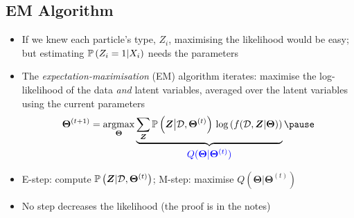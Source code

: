 \begin{slide}
\section[-1]{EM Algorithm}

\begin{PauseHighLight}
  \begin{itemize}
  \item If we knew each particle's type, $Z_i$, maximising the
    likelihood would be easy\pause{}; but estimating $\mathbb{P}\left( Z_i=1|X_i \right)$
    needs the parameters\pauseb
  \item The \emph{expectation-maximisation} (EM) algorithm iterates:
    maximise the log-likelihood of the data \emph{and} latent
    variables, averaged over the latent variables using the current
    parameters
    \begin{align*}
      \bm{\Theta}^{(t+1)} = \mathop{\mathrm{argmax}}_{\bm{\Theta}}
      \underbrace{\sum_{\bm{Z}} \Prob{\bm{Z}\big|\data,\bm{\Theta}^{(t)}}\,
      \logg{f(\data,\bm{Z}| \bm{\Theta})}}_{\textstyle\color{EmphColor}
        Q(\bm{\Theta}|\bm{\Theta}^{(t)})}\pause
    \end{align*}
  \item E-step: compute $\mathbb{P}\left( \bm{Z}|\mathcal{D},\bm{\Theta}^{(t)} \right)$;\pause{}
    M-step: maximise $Q(\bm{\Theta}|\bm{\Theta}^{(t)})$\pause
  \item No step decreases the likelihood\pause{} (the proof is in the
    notes)\pauseb
  \end{itemize}
\end{PauseHighLight}

\end{slide}


